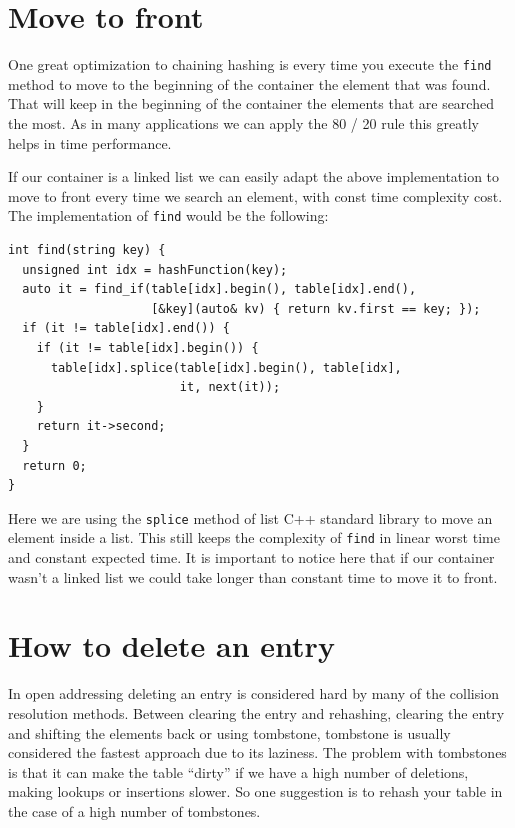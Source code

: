 \section{Move to front}

One great optimization to chaining hashing is every time you execute the \texttt{find} method to move to the beginning of the container the element that was found. That will keep in the beginning of the container the elements that are searched the most. As in many applications we can apply the 80 / 20 rule this greatly helps in time performance.

If our container is a linked list we can easily adapt the above implementation to move to front every time we search an element, with const time complexity cost. The implementation of \texttt{find} would be the following:

\begin{lstlisting}
int find(string key) {
  unsigned int idx = hashFunction(key);
  auto it = find_if(table[idx].begin(), table[idx].end(),
                    [&key](auto& kv) { return kv.first == key; });
  if (it != table[idx].end()) {
    if (it != table[idx].begin()) {
      table[idx].splice(table[idx].begin(), table[idx],
                        it, next(it));
    }
    return it->second;
  }
  return 0;
}
\end{lstlisting}

Here we are using the \texttt{splice} method of list C++ standard library to move an element inside a list. This still keeps the complexity of \texttt{find} in linear worst time and constant expected time. It is important to notice here that if our container wasn't a linked list we could take longer than constant time to move it to front.


\section{How to delete an entry}

In open addressing deleting an entry is considered hard by many of the collision resolution methods. Between clearing the entry and rehashing, clearing the entry and shifting the elements back or using tombstone, tombstone is usually considered the fastest approach due to its laziness.
The problem with tombstones is that it can make the table ``dirty'' if we have a high number of deletions, making lookups or insertions slower. So one suggestion is to rehash your table in the case of a high number of tombstones.

